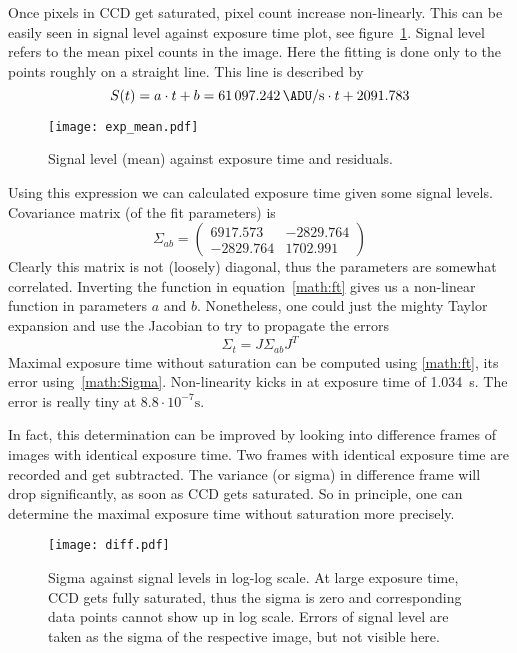 Once pixels in CCD get saturated, pixel count increase non-linearly. This can be easily seen in signal level against exposure time plot, see figure~\ref{fig:exp_mean}. Signal level refers to the mean pixel counts in the image. Here the fitting is done only to the points roughly on a straight line. This line is described by
\begin{equation}
	S(t) = a\cdot t + b =  \SI{61097.242}{\ADU \per\s} \cdot t + \num{2091.783}
	\label{math:ft}
\end{equation}
\begin{figure}[ht]
	\centering
	\texttt{[image: exp\_mean.pdf]}
	\caption{Signal level (mean) against exposure time and residuals.}%
	\label{fig:exp_mean}
\end{figure}

Using this expression we can calculated exposure time given some signal levels.
Covariance matrix (of the fit parameters) is 
\begin{equation*}
	\Sigma_{ab} =  \begin{pmatrix} 6917.573 & -2829.764 \\ -2829.764 & 1702.991 \end{pmatrix}
\end{equation*}
Clearly this matrix is not (loosely) diagonal, thus the parameters are somewhat correlated. Inverting the function in equation~\ref{math:ft} gives us a non-linear function in parameters $a$ and $b$. Nonetheless, one could just the mighty Taylor expansion and use the Jacobian to try to propagate the errors
\begin{equation}
	\Sigma_t = J \Sigma_{ab} J^T
	\label{math:Sigma}
\end{equation}
Maximal exposure time without saturation can be computed using \ref{math:ft}, its error using~\ref{math:Sigma}. Non-linearity kicks in at exposure time of \SI{1.034}{\second}. The error is really tiny at $\num{8.8} \cdot 10^{-7} \si{\s}$.

In fact, this determination can be improved by looking into difference frames of images with identical exposure time. Two frames with identical exposure time are recorded and get subtracted. The variance (or sigma) in difference frame will drop significantly, as soon as CCD gets saturated. So in principle, one can determine the maximal exposure time without saturation more precisely. \begin{figure}[ht]
	\centering
	\texttt{[image: diff.pdf]}
	\caption{Sigma against signal levels in log-log scale. At large exposure time, CCD gets fully saturated, thus the sigma is zero and corresponding data points cannot show up in log scale. Errors of signal level are taken as the sigma of the respective image, but not visible here.}%
	\label{fig:diff}
\end{figure}

